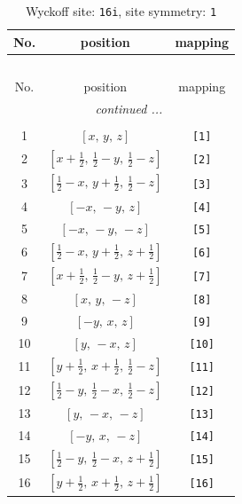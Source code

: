 \documentclass[fleqn,8pt]{jsarticle}
\begin{document}
\begin{longtable}{ccc}
\caption{Wyckoff site: {\tt 16i}, site symmetry: {\tt 1}}
 \\
 \hline \hline
No. & position & mapping \\ \hline \endfirsthead

\multicolumn{2}{l}{\tablename\ \thetable{}} \\
 \hline \hline
No. & position & mapping \\ \hline \endhead

 \hline \hline
\multicolumn{2}{r}{\footnotesize\it continued ...} \\ \endfoot

 \hline \hline
\multicolumn{2}{r}{} \\ \endlastfoot

1 & $\left[ x,\, y,\, z \right]$ & {\tt [1]} \\ \hline
2 & $\left[ x + \frac{1}{2},\, \frac{1}{2} - y,\, \frac{1}{2} - z \right]$ & {\tt [2]} \\ \hline
3 & $\left[ \frac{1}{2} - x,\, y + \frac{1}{2},\, \frac{1}{2} - z \right]$ & {\tt [3]} \\ \hline
4 & $\left[ - x,\, - y,\, z \right]$ & {\tt [4]} \\ \hline
5 & $\left[ - x,\, - y,\, - z \right]$ & {\tt [5]} \\ \hline
6 & $\left[ \frac{1}{2} - x,\, y + \frac{1}{2},\, z + \frac{1}{2} \right]$ & {\tt [6]} \\ \hline
7 & $\left[ x + \frac{1}{2},\, \frac{1}{2} - y,\, z + \frac{1}{2} \right]$ & {\tt [7]} \\ \hline
8 & $\left[ x,\, y,\, - z \right]$ & {\tt [8]} \\ \hline
9 & $\left[ - y,\, x,\, z \right]$ & {\tt [9]} \\ \hline
10 & $\left[ y,\, - x,\, z \right]$ & {\tt [10]} \\ \hline
11 & $\left[ y + \frac{1}{2},\, x + \frac{1}{2},\, \frac{1}{2} - z \right]$ & {\tt [11]} \\ \hline
12 & $\left[ \frac{1}{2} - y,\, \frac{1}{2} - x,\, \frac{1}{2} - z \right]$ & {\tt [12]} \\ \hline
13 & $\left[ y,\, - x,\, - z \right]$ & {\tt [13]} \\ \hline
14 & $\left[ - y,\, x,\, - z \right]$ & {\tt [14]} \\ \hline
15 & $\left[ \frac{1}{2} - y,\, \frac{1}{2} - x,\, z + \frac{1}{2} \right]$ & {\tt [15]} \\ \hline
16 & $\left[ y + \frac{1}{2},\, x + \frac{1}{2},\, z + \frac{1}{2} \right]$ & {\tt [16]} \\
\end{longtable}
\end{document}
